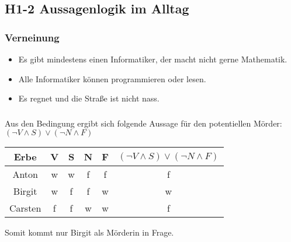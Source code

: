 \documentclass{article}
\begin{document}
\subsection{H1-2 Aussagenlogik im Alltag}
\subsubsection{Verneinung}

\begin{itemize}
  \item Es gibt mindestens einen Informatiker, der macht nicht gerne Mathematik.
  \item Alle Informatiker können programmieren oder lesen.
  \item Es regnet und die Straße ist nicht nass.
\end{itemize}

\subsubsection{}
Aus den Bedingung ergibt sich folgende Aussage für den potentiellen Mörder:
\((\neg V \land S) \lor (\neg N \land F)\)

\begin{center}
\begin{tabular}{|c || c c c c | c |}
  Erbe & V & S & N & F & \( (\neg V \land S) \lor (\neg N \land F) \) \\
  \hline
  Anton & w & w & f & f & f\\
  Birgit & w & f & f & w & w\\
  Carsten & f & f & w & w & f \\
\end{tabular}
\end{center}

Somit kommt nur Birgit als Mörderin in Frage.
\end{document}
